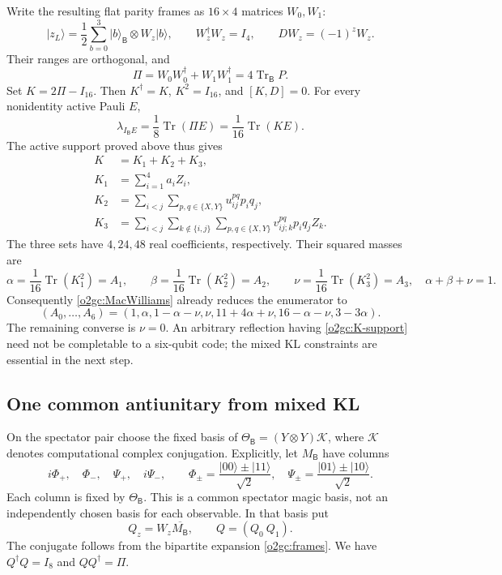 \documentclass[11pt]{article}
\newcommand{\ket}[1]{\lvert #1\rangle}
\theoremstyle{definition}
\begin{document}
Write the resulting flat parity frames as \(16\times4\) matrices
\(W_0,W_1\):
\begin{equation}
 \ket{z_L}=\frac12\sum_{b=0}^3\ket b_{\mathsf B}\otimes W_z\ket b,
 \qquad W_z^\dagger W_z=I_4,\qquad DW_z=(-1)^zW_z.
 \label{o2gc:frames}
\end{equation}
Their ranges are orthogonal, and
\[
 \Pi=W_0W_0^\dagger+W_1W_1^\dagger
     =4\operatorname{Tr}_{\mathsf B}P.
\]
Set \(K=2\Pi-I_{16}\). Then \(K^\dagger=K\), \(K^2=I_{16}\), and
\([K,D]=0\). For every nonidentity active Pauli \(E\),
\begin{equation}
 \lambda_{I_{\mathsf B}E}
 =\frac18\operatorname{Tr}(\Pi E)
 =\frac1{16}\operatorname{Tr}(KE).
 \label{o2gc:normalization}
\end{equation}
The active support proved above thus gives
\begin{align}
 K&=K_1+K_2+K_3,\label{o2gc:K-support}\\
 K_1&=\sum_{i=1}^4a_iZ_i,\nonumber\\
 K_2&=\sum_{i<j}\sum_{p,q\in\{X,Y\}}u_{ij}^{pq}p_iq_j,\nonumber\\
 K_3&=\sum_{i<j}\sum_{k\notin\{i,j\}}
              \sum_{p,q\in\{X,Y\}}v_{ij;k}^{pq}p_iq_jZ_k.\nonumber
\end{align}
The three sets have \(4,24,48\) real coefficients, respectively. Their
squared masses are
\begin{equation}
 \alpha=\frac1{16}\operatorname{Tr}(K_1^2)=A_1,\qquad
 \beta=\frac1{16}\operatorname{Tr}(K_2^2)=A_2,\qquad
 \nu=\frac1{16}\operatorname{Tr}(K_3^2)=A_3,
 \quad \alpha+\beta+\nu=1.
 \label{o2gc:masses}
\end{equation}
Consequently \eqref{o2gc:MacWilliams} already reduces the enumerator to
\begin{equation}
 (A_0,\ldots,A_6)=
 (1,\alpha,1-\alpha-\nu,\nu,
   11+4\alpha+\nu,16-\alpha-\nu,3-3\alpha).
 \label{o2gc:plane}
\end{equation}
The remaining converse is \(\nu=0\). An arbitrary reflection having
\eqref{o2gc:K-support} need not be completable to a six-qubit code; the
mixed KL constraints are essential in the next step.

\subsection{One common antiunitary from mixed KL}
\label{o2gc:subsec-commonJ}

On the spectator pair choose the fixed basis of
\(\Theta_{\mathsf B}=(Y\otimes Y)\mathcal K\), where \(\mathcal K\)
denotes computational complex conjugation. Explicitly, let \(M_{\mathsf B}\)
have columns
\[
 i\Phi_+,\quad\Phi_-,\quad\Psi_+,\quad i\Psi_-,
 \qquad
 \Phi_\pm=\frac{\ket{00}\pm\ket{11}}{\sqrt2},\quad
 \Psi_\pm=\frac{\ket{01}\pm\ket{10}}{\sqrt2}.
\]
Each column is fixed by \(\Theta_{\mathsf B}\). This is a common
spectator magic basis, not an independently chosen basis for each
observable. In that basis put
\[
 Q_z=W_z\overline{M_{\mathsf B}},\qquad Q=(Q_0\ Q_1).
\]
The conjugate follows from the bipartite expansion
\eqref{o2gc:frames}. We have \(Q^\dagger Q=I_8\) and \(QQ^\dagger=\Pi\).
\end{document}

